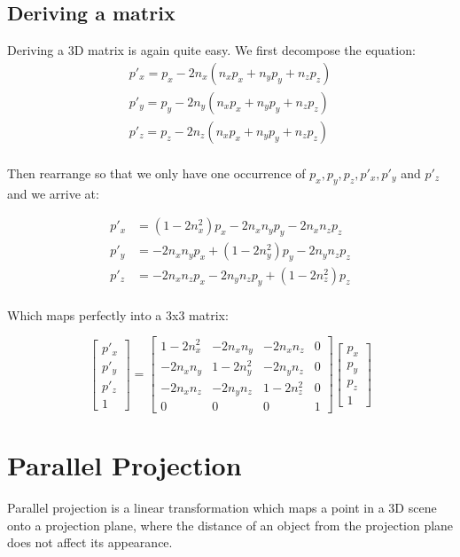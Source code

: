 \documentclass[]{report}   %
\begin{document}
\subsection{Deriving a matrix}
Deriving a 3D matrix is again quite easy. We first decompose the equation:
\begin{align*}
	p\prime_x = p_x - 2n_x(n_x p_x + n_y p_y + n_z p_z)		\\
	p\prime_y = p_y - 2n_y(n_x p_x + n_y p_y + n_z p_z)		\\
	p\prime_z = p_z - 2n_z(n_x p_x + n_y p_y + n_z p_z)		\\
\end{align*}

Then rearrange so that we only have one occurrence of \(p_x, p_y, p_z, p\prime_x, p\prime_y\) and \(p\prime_z\)and we arrive at:

\begin{align*}
	p\prime_x &= (1 - 2n_x^2)p_x -2n_x n_y p_y -2n_x n_z p_z	\\
	p\prime_y &= -2n_x n_y p_x + (1 - 2n_y^2)p_y -2n_y n_z p_z	\\
	p\prime_z &= -2n_x n_z p_x -2n_y n_z p_y + (1 - 2n_z^2)p_z	\\
\end{align*}

Which maps perfectly into a 3x3 matrix:

\[
	\begin{bmatrix}
	p\prime_x \\
	p\prime_y \\
	p\prime_z \\
	1
	\end{bmatrix}
	=	
	\begin{bmatrix}
		1 - 2n_x^2	&	-2n_x n_y	&	-2n_x n_z	&	0 \\
		-2n_x n_y	&	1 - 2n_y^2	& 	-2n_y n_z	&	0 \\
		-2n_x n_z	&	-2n_y n_z	&	1 - 2n_z^2	&	0 \\
		0 			&		0 		& 		0 		&	1
	\end{bmatrix}
	\begin{bmatrix}
		p_x \\
		p_y \\
		p_z \\
		1
	\end{bmatrix}
\]



\section{Parallel Projection}
Parallel projection is a linear transformation which maps a point in a 3D scene onto a projection plane, where the distance of an object from the projection plane does not affect its appearance.
\end{document}
